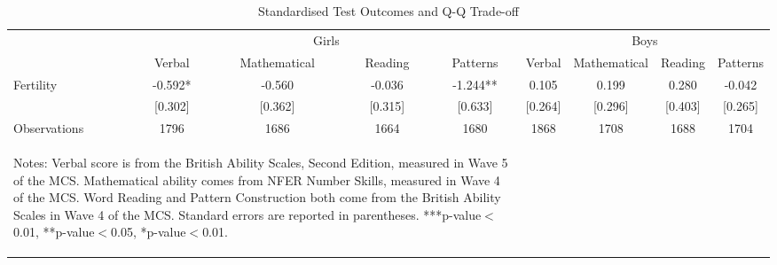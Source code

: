 \begin{table}[htbp]\centering
\def\sym#1{\ifmmode^{#1}\else\(^{#1}\)\fi}
\caption{Standardised Test Outcomes and Q-Q Trade-off}
\begin{tabular}{l*{8}{c}}
\toprule
                    &\multicolumn{4}{c}{Girls}                                      &\multicolumn{4}{c}{Boys}                                       \\\cmidrule(lr){2-5}\cmidrule(lr){6-9}
                    &      Verbal   &Mathematical   &     Reading   &    Patterns   &      Verbal   &Mathematical   &     Reading   &    Patterns   \\
\midrule
Fertility           &      -0.592*  &      -0.560   &      -0.036   &      -1.244** &       0.105   &       0.199   &       0.280   &      -0.042   \\
                    &     [0.302]   &     [0.362]   &     [0.315]   &     [0.633]   &     [0.264]   &     [0.296]   &     [0.403]   &     [0.265]   \\
\midrule
Observations        &        1796   &        1686   &        1664   &        1680   &        1868   &        1708   &        1688   &        1704   \\
\bottomrule\multicolumn{5}{p{14.6cm}}{\begin{footnotesize}        
Notes: Verbal score is from the British Ability Scales, Second Edition, measured in Wave 5 of the MCS. Mathematical ability comes from NFER Number Skills, measured in Wave 4 of the MCS. Word Reading and Pattern Construction both come from the British Ability Scales in Wave 4 of the MCS. Standard errors are reported in parentheses. ***p-value$<$0.01, **p-value$<$0.05, *p-value$<$0.01.                                
\end{footnotesize}}\end{tabular}\end{table}

